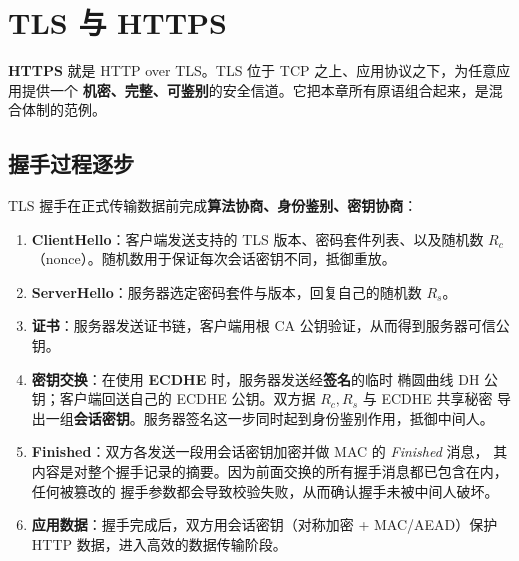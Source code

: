 \section{TLS 与 HTTPS}

\textbf{HTTPS} 就是 HTTP over TLS。TLS 位于 TCP 之上、应用协议之下，为任意应用提供一个
\textbf{机密、完整、可鉴别}的安全信道。它把本章所有原语组合起来，是混合体制的范例。

\subsection{握手过程逐步}

TLS 握手在正式传输数据前完成\textbf{算法协商、身份鉴别、密钥协商}：

\begin{enumerate}
    \item \textbf{ClientHello}：客户端发送支持的 TLS 版本、密码套件列表、以及随机数
    $R_c$（nonce）。随机数用于保证每次会话密钥不同，抵御重放。
    \item \textbf{ServerHello}：服务器选定密码套件与版本，回复自己的随机数 $R_s$。
    \item \textbf{证书}：服务器发送证书链，客户端用根 CA 公钥验证，从而得到服务器可信公钥。
    \item \textbf{密钥交换}：在使用 \textbf{ECDHE} 时，服务器发送经\textbf{签名}的临时
    椭圆曲线 DH 公钥；客户端回送自己的 ECDHE 公钥。双方据 $R_c,R_s$ 与 ECDHE 共享秘密
    导出一组\textbf{会话密钥}。服务器签名这一步同时起到身份鉴别作用，抵御中间人。
    \item \textbf{Finished}：双方各发送一段用会话密钥加密并做 MAC 的 \emph{Finished} 消息，
    其内容是对整个握手记录的摘要。因为前面交换的所有握手消息都已包含在内，任何被篡改的
    握手参数都会导致校验失败，从而确认握手未被中间人破坏。
    \item \textbf{应用数据}：握手完成后，双方用会话密钥（对称加密 + MAC/AEAD）保护
    HTTP 数据，进入高效的数据传输阶段。
\end{enumerate}

